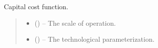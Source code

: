 \documentclass[letterpaper,10pt,english]{sphinxmanual}
\begin{document}
\begin{fulllineitems}
\label{\detokenize{technology:technology.tutorial_basic.fixed_cost}}
\pysigstartsignatures
{}
\pysigstopsignatures
\sphinxAtStartPar
Capital cost function.
\begin{quote}\begin{description}
\begin{itemize}
\item {} 
\sphinxAtStartPar
{} () – The scale of operation.

\item {} 
\sphinxAtStartPar
{} () – The technological parameterization.

\end{itemize}

\end{description}\end{quote}

\end{fulllineitems}

\end{document}
